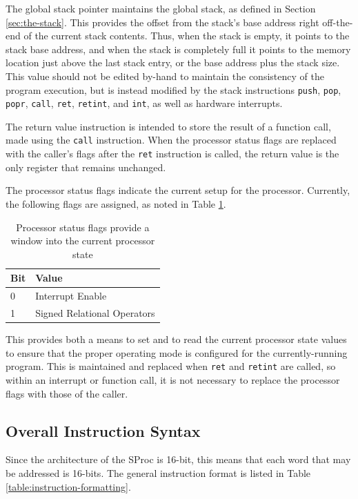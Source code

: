 \documentclass{article}
\begin{document}
The global stack pointer maintains the global stack, as defined in Section \ref{sec:the-stack}. This provides the offset from the stack's base address right off-the-end of the current stack contents. Thus, when the stack is empty, it points to the stack base address, and when the stack is completely full it points to the memory location just above the last stack entry, or the base address plus the stack size. This value should not be edited by-hand to maintain the consistency of the program execution, but is instead modified by the stack instructions \texttt{push}, \texttt{pop}, \texttt{popr}, \texttt{call}, \texttt{ret}, \texttt{retint}, and \texttt{int}, as well as hardware interrupts.

The return value instruction is intended to store the result of a function call, made using the \texttt{call} instruction. When the processor status flags are replaced with the caller's flags after the \texttt{ret} instruction is called, the return value is the only register that remains unchanged.

The processor status flags indicate the current setup for the processor. Currently, the following flags are assigned, as noted in Table \ref{table:processor-flags}.

\begin{table}[h!]
	\centering
	\begin{tabular}{l|l}
		\hline
		Bit & Value \\
		\hline
		0 & Interrupt Enable \\
		1 & Signed Relational Operators \\
		\hline
	\end{tabular}
	\caption{Processor status flags provide a window into the current processor state}
	\label{table:processor-flags}
 \end{table}

This provides both a means to set and to read the current processor state values to ensure that the proper operating mode is configured for the currently-running program. This is maintained and replaced when \texttt{ret} and \texttt{retint} are called, so within an interrupt or function call, it is not necessary to replace the processor flags with those of the caller.

\subsection{Overall Instruction Syntax}

Since the architecture of the SProc is 16-bit, this means that each word that may be addressed is 16-bits. The general instruction format is listed  in Table \ref{table:instruction-formatting}.
\end{document}
